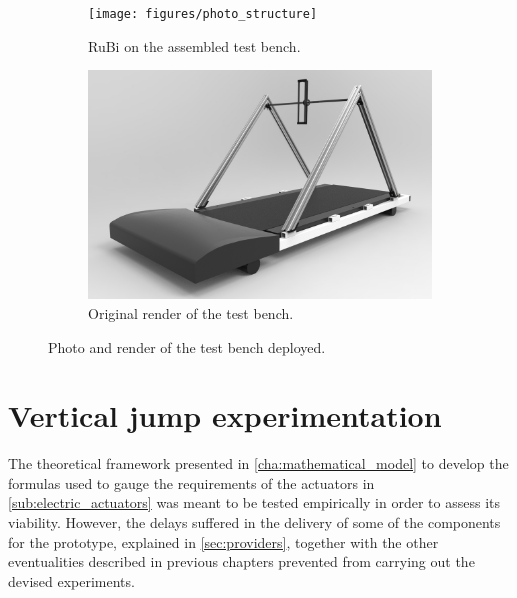 \begin{figure}[ht!]
    \centering
    \begin{subfigure}[b]{0.49\textwidth}
        \texttt{[image: figures/photo\_structure]}
        \caption{RuBi on the assembled test bench.}
        \label{fig:photo_structure}
    \end{subfigure}
    \begin{subfigure}[b]{0.49\textwidth}
        \includegraphics[width=\textwidth]{figures/legs_structure}
        \caption{Original render of the test bench.}
        \label{fig:legs_structure}
    \end{subfigure}
    \caption{Photo and render of the test bench deployed.}
\end{figure}  



\section{Vertical jump experimentation} %
\label{sec:vertical_jump_experimentation}
The theoretical framework presented in \ref{cha:mathematical_model} to develop the formulas used to gauge the requirements of the actuators in \ref{sub:electric_actuators} was meant to be tested empirically in order to assess its viability.
However, the delays suffered in the delivery of some of the components for the prototype, explained in \ref{sec:providers},
together with the other eventualities described in previous chapters prevented from carrying out the devised experiments.

